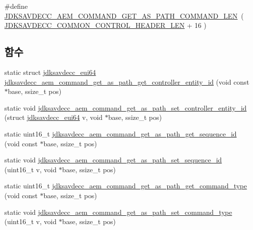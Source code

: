 \begin{DoxyCompactItemize}
\item 
\#define \hyperlink{group__command__get__as__path_ga2f85175bfed0a804e0cce9639a16eb98}{J\+D\+K\+S\+A\+V\+D\+E\+C\+C\+\_\+\+A\+E\+M\+\_\+\+C\+O\+M\+M\+A\+N\+D\+\_\+\+G\+E\+T\+\_\+\+A\+S\+\_\+\+P\+A\+T\+H\+\_\+\+C\+O\+M\+M\+A\+N\+D\+\_\+\+L\+EN}~( \hyperlink{group__jdksavdecc__avtp__common__control__header_gaae84052886fb1bb42f3bc5f85b741dff}{J\+D\+K\+S\+A\+V\+D\+E\+C\+C\+\_\+\+C\+O\+M\+M\+O\+N\+\_\+\+C\+O\+N\+T\+R\+O\+L\+\_\+\+H\+E\+A\+D\+E\+R\+\_\+\+L\+EN} + 16 )
\end{DoxyCompactItemize}
\subsection*{함수}
\begin{DoxyCompactItemize}
\item 
static struct \hyperlink{structjdksavdecc__eui64}{jdksavdecc\+\_\+eui64} \hyperlink{group__command__get__as__path_gaf78e95da00cc110176f22268de35f602}{jdksavdecc\+\_\+aem\+\_\+command\+\_\+get\+\_\+as\+\_\+path\+\_\+get\+\_\+controller\+\_\+entity\+\_\+id} (void const $\ast$base, ssize\+\_\+t pos)
\item 
static void \hyperlink{group__command__get__as__path_ga11544efaadd18c19df6e1e20c981e190}{jdksavdecc\+\_\+aem\+\_\+command\+\_\+get\+\_\+as\+\_\+path\+\_\+set\+\_\+controller\+\_\+entity\+\_\+id} (struct \hyperlink{structjdksavdecc__eui64}{jdksavdecc\+\_\+eui64} v, void $\ast$base, ssize\+\_\+t pos)
\item 
static uint16\+\_\+t \hyperlink{group__command__get__as__path_ga1cf6f892d90433960dfdaa38f95fd9a6}{jdksavdecc\+\_\+aem\+\_\+command\+\_\+get\+\_\+as\+\_\+path\+\_\+get\+\_\+sequence\+\_\+id} (void const $\ast$base, ssize\+\_\+t pos)
\item 
static void \hyperlink{group__command__get__as__path_ga8dcee0f1a6bcc74aa9f10d4f21ac34a1}{jdksavdecc\+\_\+aem\+\_\+command\+\_\+get\+\_\+as\+\_\+path\+\_\+set\+\_\+sequence\+\_\+id} (uint16\+\_\+t v, void $\ast$base, ssize\+\_\+t pos)
\item 
static uint16\+\_\+t \hyperlink{group__command__get__as__path_gad7182ad6d83511a68a6ffedaba50786f}{jdksavdecc\+\_\+aem\+\_\+command\+\_\+get\+\_\+as\+\_\+path\+\_\+get\+\_\+command\+\_\+type} (void const $\ast$base, ssize\+\_\+t pos)
\item 
static void \hyperlink{group__command__get__as__path_gabe0d74ff28dcbbe70c55bc5137d80d7d}{jdksavdecc\+\_\+aem\+\_\+command\+\_\+get\+\_\+as\+\_\+path\+\_\+set\+\_\+command\+\_\+type} (uint16\+\_\+t v, void $\ast$base, ssize\+\_\+t pos)

\end{DoxyCompactItemize}
